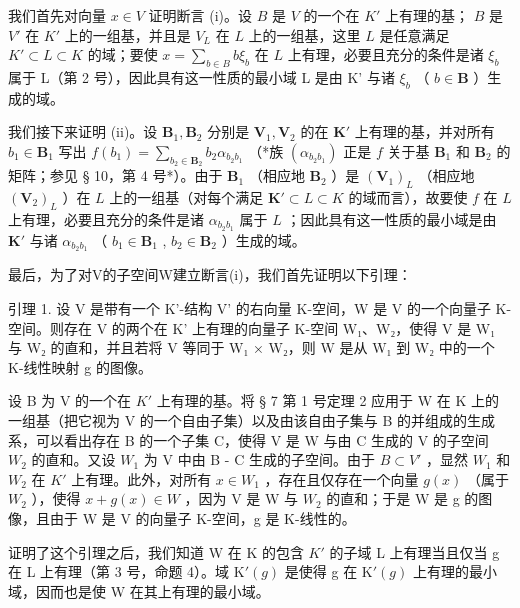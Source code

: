 我们首先对向量 \(x \in V\) 证明断言 (i)。设 \(B\) 是 \(V\) 的一个在 \(K'\) 上有理的基； \(B\) 是 \(V'\) 在 \(K'\) 上的一组基，并且是 \(V_L\) 在 \(L\) 上的一组基，这里 \(L\) 是任意满足 \(K' \subset L \subset K\) 的域；要使 \(x = \sum_{b \in B} b\xi_b\) 在 \(L\) 上有理，必要且充分的条件是诸 \(\xi_{b}\) 属于 L（第 2 号），因此具有这一性质的最小域 L 是由 K' 与诸 \(\xi_{b}\) （ \(b \in \mathbf{B}\) ）生成的域。

我们接下来证明 (ii)。设 \(\mathbf{B}_1, \mathbf{B}_2\) 分别是 \(\mathbf{V}_1, \mathbf{V}_2\) 的在 \(\mathbf{K}'\) 上有理的基，并对所有 \(b_1 \in \mathbf{B}_1\) 写出 \(f(b_1) = \sum_{b_2 \in \mathbf{B}_2} b_2 \alpha_{b_2 b_1}\) （*族 \((\alpha_{b_2 b_1})\) 正是 \(f\) 关于基 \(\mathbf{B}_1\) 和 \(\mathbf{B}_2\) 的矩阵；参见 § 10，第 4 号*）。由于 \(\mathbf{B}_1\) （相应地 \(\mathbf{B}_2\) ）是 \((\mathbf{V}_1)_L\) （相应地 \((\mathbf{V}_2)_L\) ）在 \(L\) 上的一组基（对每个满足 \(\mathbf{K}' \subset L \subset K\) 的域而言），故要使 \(f\) 在 \(L\) 上有理，必要且充分的条件是诸 \(\alpha_{b_2 b_1}\) 属于 \(L\) ；因此具有这一性质的最小域是由 \(\mathbf{K}'\) 与诸 \(\alpha_{b_2 b_1}\) （ \(b_1 \in \mathbf{B}_1\) , \(b_2 \in \mathbf{B}_2\) ）生成的域。

最后，为了对V的子空间W建立断言(i)，我们首先证明以下引理：

引理 1. 设 V 是带有一个 K'-结构 V' 的右向量 K-空间，W 是 V 的一个向量子 K-空间。则存在 V 的两个在 K' 上有理的向量子 K-空间 W₁、W₂，使得 V 是 W₁ 与 W₂ 的直和，并且若将 V 等同于 W₁ × W₂，则 W 是从 W₁ 到 W₂ 中的一个 K-线性映射 g 的图像。

设 B 为 V 的一个在 \(K'\) 上有理的基。将 § 7 第 1 号定理 2 应用于 W 在 K 上的一组基（把它视为 V 的一个自由子集）以及由该自由子集与 B 的并组成的生成系，可以看出存在 B 的一个子集 C，使得 V 是 W 与由 C 生成的 V 的子空间 \(W_{2}\) 的直和。又设 \(W_{1}\) 为 V 中由 B - C 生成的子空间。由于 \(B \subset V'\) ，显然 \(W_{1}\) 和 \(W_{2}\) 在 \(K'\) 上有理。此外，对所有 \(x \in W_{1}\) ，存在且仅存在一个向量 \(g(x)\) （属于 \(W_{2}\) ），使得 \(x + g(x) \in W\) ，因为 V 是 W 与 \(W_{2}\) 的直和；于是 W 是 g 的图像，且由于 W 是 V 的向量子 K-空间，g 是 K-线性的。

证明了这个引理之后，我们知道 W 在 K 的包含 \(K'\) 的子域 L 上有理当且仅当 g 在 L 上有理（第 3 号，命题 4）。域 \(\mathrm{K}'(g)\) 是使得 g 在 \(\mathrm{K}'(g)\) 上有理的最小域，因而也是使 W 在其上有理的最小域。
